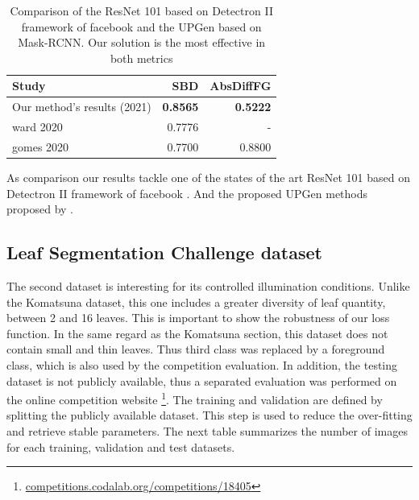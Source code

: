 \documentclass[../thesis.tex]{subfiles}
\begin{document}
    \begin{table}[H]
        \centering
        \begin{tabularx}{\linewidth}{|X|r|r|}
            \hline
            \textbf{Study}                                       & \textbf{SBD} & \textbf{AbsDiffFG} \\ \hline
            Our method's results (2021)                & \textbf{0.8565} & \textbf{0.5222} \\
            \cite{ward2020scalable}      ward 2020      & 0.7776 &   -    \\
            \cite{gomes2020leaf}         gomes 2020     & 0.7700 & 0.8800 \\
            \hline
        \end{tabularx}
        \caption{Comparison of the ResNet 101 based on Detectron II framework of facebook and the UPGen based on Mask-RCNN. Our solution is the most effective in both metrics}
        \label{tab:komatsuna-detectron}
    \end{table}
    As comparison our results tackle one of the states of the art ResNet 101 based on Detectron II framework of facebook \cite{gomes2020leaf}. And the proposed UPGen methods proposed by \cite{ward2020scalable}.
    
    \subsection{Leaf Segmentation Challenge dataset}
    
    The second dataset is interesting for its controlled illumination conditions. Unlike the Komatsuna dataset, this one includes a greater diversity of leaf quantity, between 2 and 16 leaves. This is important to show the robustness of our loss function.
    In the same regard as the Komatsuna section, this dataset does not contain small and thin leaves. Thus third class was replaced by a foreground class, which is also used by the competition evaluation. In addition, the testing dataset is not publicly available, thus a separated evaluation was performed on the online competition website \footnote{\url{competitions.codalab.org/competitions/18405}}. The training and validation are defined by splitting the publicly available dataset. This step is used to reduce the over-fitting and retrieve stable parameters. The next table summarizes the number of images for each training, validation and test datasets.
    
\end{document}
